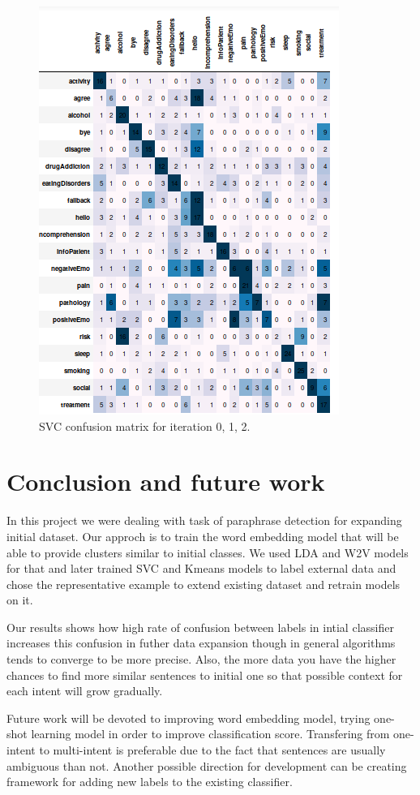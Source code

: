 \documentclass[11pt]{article}
\begin{document}
\begin{figure}[h]
	\includegraphics[scale=0.25]{svc2_cm.png}
	\caption{SVC confusion matrix for iteration 0, 1, 2.}
\label{lda_gm_cm}
\end{figure}
\FloatBarrier


\section{Conclusion and future work}
\label{sec:conclusion}

In this project we were dealing with task of paraphrase detection for expanding initial dataset. Our approch is to train the word embedding model that will be able to provide clusters similar to initial classes. We used LDA and W2V models for that and later trained SVC and Kmeans models to label external data and chose the representative example to extend existing dataset and retrain models on it.

Our results shows how high rate of confusion between labels in intial classifier increases this confusion in futher data expansion though in general algorithms tends to converge to be more precise. Also, the more data you have the higher chances to find more similar sentences to initial one so that possible context for each intent will grow gradually.

Future work will be devoted to improving word embedding model, trying one-shot learning model in order to improve classification score. Transfering from one-intent to multi-intent is preferable due to the fact that sentences are usually ambiguous than not. Another possible direction for development can be creating framework for adding new labels to the existing classifier.
\end{document}
